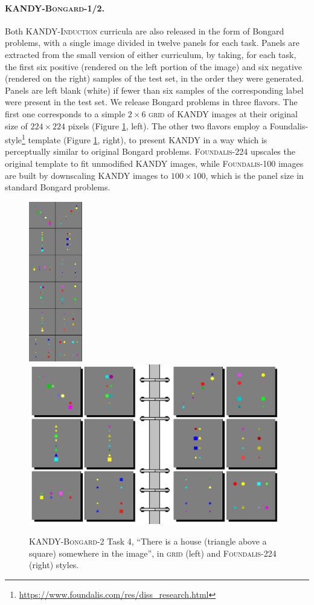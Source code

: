\paragraph{\textsc{KANDY-Bongard-1/2}.} Both \textsc{KANDY-Induction} curricula are also released in the form of Bongard problems, with a single image divided in twelve panels for each task. Panels are extracted from the small version of either curriculum, by taking, for each task, the first six positive (rendered on the left portion of the image) and six negative (rendered on the right) samples of the test set, in the order they were generated. Panels are left blank (white) if fewer than six samples of the corresponding label were present in the test set.
We release Bongard problems in three flavors. The first one corresponds to a simple $2\times6$ \textsc{grid} of \textsc{KANDY} images at their original size of  $224 \times 224$ pixels (Figure \ref{kandy:fig:bongard}, left). The other two flavors employ a Foundalis-style\footnote{\url{https://www.foundalis.com/res/diss_research.html}} template (Figure \ref{kandy:fig:bongard}, right), to present \textsc{KANDY} in a way which is perceptually similar to original Bongard problems. \textsc{Foundalis-224} upscales the original template to fit unmodified KANDY images, while \textsc{Foundalis-100} images  are built by downscaling KANDY images to $100\times 100$, which is the panel size in standard Bongard problems.

\begin{figure}
    \centering
    \includegraphics[height=7cm]{imgs/kandy/Fig2a}
    \hfill
    \includegraphics[height=7cm]{imgs/kandy/Fig2b}
    \caption[\textsc{KANDY-Bongard-2} task 4]{\textsc{KANDY-Bongard-2} Task 4, ``There is a house (triangle above a square) somewhere in the image'', in \textsc{grid} (left) and \textsc{Foundalis-224} (right) styles.}
    \label{kandy:fig:bongard}
\end{figure}


